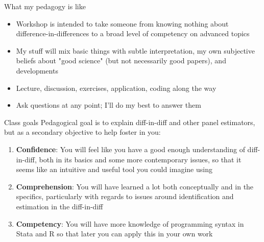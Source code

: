 \documentclass{beamer}
\begin{document}
\begin{frame}{What my pedagogy is like}

\begin{itemize}
\item Workshop is intended to take someone from knowing nothing about difference-in-differences to a broad level of competency on advanced topics
\item My stuff will mix basic things with subtle interpretation, my own subjective beliefs about "good science" (but not necessarily good papers), and developments
\item Lecture, discussion, exercises, application, coding along the way
\item Ask questions at any point; I'll do my best to answer them
\end{itemize}

\end{frame}


\begin{frame}{Class goals}
Pedagogical goal is to explain diff-in-diff and other panel estimators, but as a secondary objective to help foster in you:

  \begin{enumerate}
    \item \textbf{Confidence}: You will feel like you have a good enough understanding of diff-in-diff, both in its basics and some more contemporary issues, so that it seems like an intuitive and useful tool you could imagine using
    \item \textbf{Comprehension}: You will have learned a lot both conceptually and in the specifics, particularly with regards to issues around identification and estimation in the diff-in-diff
    \item \textbf{Competency}: You will have more knowledge of programming syntax in Stata and R so that later you can apply this in your own work
  \end{enumerate}

\end{frame}
\end{document}
